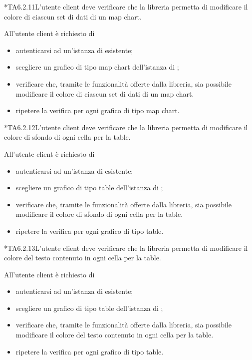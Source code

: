 	*{TA6.2.11}L'utente client deve verificare che la libreria permetta di modificare il colore di ciascun set di dati di un map chart.
		
		All'utente client è richiesto di
		\begin{itemize}
			\item autenticarsi ad un'istanza di \projectname{} esistente;
			\item scegliere un grafico di tipo map chart dell'istanza di \projectname{};
			\item verificare che, tramite le funzionalità offerte dalla libreria, sia possibile modificare il colore di ciascun set di dati di un map chart.
			\item ripetere la verifica per ogni grafico di tipo map chart.
		\end{itemize}

	*{TA6.2.12}L'utente client deve verificare che la libreria permetta di modificare il colore di sfondo di ogni cella per la table.
		
		All'utente client è richiesto di
		\begin{itemize}
			\item autenticarsi ad un'istanza di \projectname{} esistente;
			\item scegliere un grafico di tipo table dell'istanza di \projectname{};
			\item verificare che, tramite le funzionalità offerte dalla libreria, sia possibile modificare il colore di sfondo di ogni cella per la table.
			\item ripetere la verifica per ogni grafico di tipo table.
		\end{itemize}

	*{TA6.2.13}L'utente client deve verificare che la libreria permetta di modificare il colore del testo contenuto in ogni cella per la table.
		
		All'utente client è richiesto di
		\begin{itemize}
			\item autenticarsi ad un'istanza di \projectname{} esistente;
			\item scegliere un grafico di tipo table dell'istanza di \projectname{};
			\item verificare che, tramite le funzionalità offerte dalla libreria, sia possibile modificare il colore del testo contenuto in ogni cella per la table.
			\item ripetere la verifica per ogni grafico di tipo table.
		\end{itemize}


